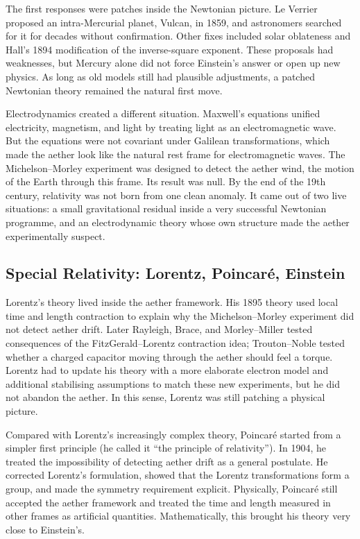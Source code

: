 \documentclass{article}
\begin{document}
The first responses were patches inside the Newtonian picture. Le Verrier proposed an intra-Mercurial planet, Vulcan, in 1859, and astronomers searched for it for decades without confirmation. Other fixes included solar oblateness and Hall's 1894 modification of the inverse-square exponent. These proposals had weaknesses, but Mercury alone did not force Einstein's answer or open up new physics. As long as old models still had plausible adjustments, a patched Newtonian theory remained the natural first move.

Electrodynamics created a different situation. Maxwell's equations unified electricity, magnetism, and light by treating light as an electromagnetic wave. But the equations were not covariant under Galilean transformations, which made the aether look like the natural rest frame for electromagnetic waves. The Michelson--Morley experiment was designed to detect the aether wind, the motion of the Earth through this frame. Its result was null. By the end of the 19th century, relativity was not born from one clean anomaly. It came out of two live situations: a small gravitational residual inside a very successful Newtonian programme, and an electrodynamic theory whose own structure made the aether experimentally suspect.

\subsection{Special Relativity: Lorentz, Poincaré, Einstein}
Lorentz's theory lived inside the aether framework. His 1895 theory used local time and length contraction to explain why the Michelson--Morley experiment did not detect aether drift. Later Rayleigh, Brace, and Morley--Miller tested consequences of the FitzGerald--Lorentz contraction idea; Trouton--Noble tested whether a charged capacitor moving through the aether should feel a torque. Lorentz had to update his theory with a more elaborate electron model and additional stabilising assumptions to match these new experiments, but he did not abandon the aether. In this sense, Lorentz was still patching a physical picture.

Compared with Lorentz's increasingly complex theory, Poincaré started from a simpler first principle (he called it ``the principle of relativity''). In 1904, he treated the impossibility of detecting aether drift as a general postulate. He corrected Lorentz's formulation, showed that the Lorentz transformations form a group, and made the symmetry requirement explicit. Physically, Poincaré still accepted the aether framework and treated the time and length measured in other frames as artificial quantities. Mathematically, this brought his theory very close to Einstein's.
\end{document}
